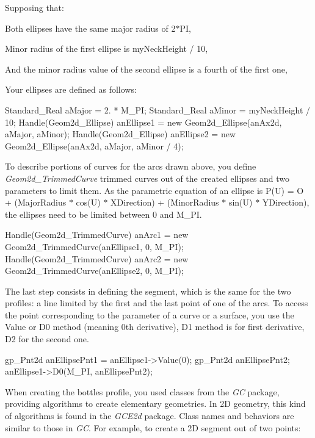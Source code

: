 Supposing that\+:


\begin{DoxyItemize}
\item Both ellipses have the same major radius of 2$\ast$\+PI,
\item Minor radius of the first ellipse is my\+Neck\+Height / 10,
\item And the minor radius value of the second ellipse is a fourth of the first one,
\end{DoxyItemize}

Your ellipses are defined as follows\+:


\begin{DoxyCode}
Standard\_Real aMajor = 2. * M\_PI;
Standard\_Real aMinor = myNeckHeight / 10;
Handle(Geom2d\_Ellipse) anEllipse1 = \textcolor{keyword}{new} Geom2d\_Ellipse(anAx2d, aMajor, aMinor);
Handle(Geom2d\_Ellipse) anEllipse2 = \textcolor{keyword}{new} Geom2d\_Ellipse(anAx2d, aMajor, aMinor / 4);
\end{DoxyCode}


To describe portions of curves for the arcs drawn above, you define {\itshape Geom2d\+\_\+\+Trimmed\+Curve} trimmed curves out of the created ellipses and two parameters to limit them. As the parametric equation of an ellipse is P(\+U) = O + (Major\+Radius $\ast$ cos(\+U) $\ast$ X\+Direction) + (Minor\+Radius $\ast$ sin(\+U) $\ast$ Y\+Direction), the ellipses need to be limited between 0 and M\+\_\+\+PI.


\begin{DoxyCode}
Handle(Geom2d\_TrimmedCurve) anArc1 = \textcolor{keyword}{new} Geom2d\_TrimmedCurve(anEllipse1, 0, M\_PI);
Handle(Geom2d\_TrimmedCurve) anArc2 = \textcolor{keyword}{new} Geom2d\_TrimmedCurve(anEllipse2, 0, M\_PI);
\end{DoxyCode}


The last step consists in defining the segment, which is the same for the two profiles\+: a line limited by the first and the last point of one of the arcs. To access the point corresponding to the parameter of a curve or a surface, you use the Value or D0 method (meaning 0th derivative), D1 method is for first derivative, D2 for the second one.


\begin{DoxyCode}
gp\_Pnt2d anEllipsePnt1 = anEllipse1->Value(0);
gp\_Pnt2d anEllipsePnt2;
anEllipse1->D0(M\_PI, anEllipsePnt2);
\end{DoxyCode}


When creating the bottle\textquotesingle{}s profile, you used classes from the {\itshape GC} package, providing algorithms to create elementary geometries. In 2D geometry, this kind of algorithms is found in the {\itshape G\+C\+E2d} package. Class names and behaviors are similar to those in {\itshape GC}. For example, to create a 2D segment out of two points\+:


